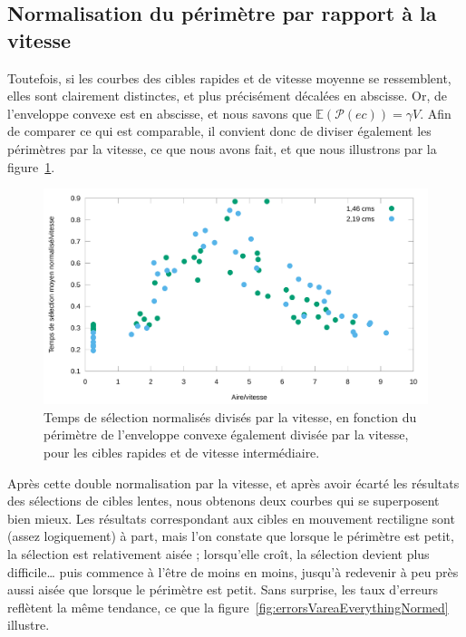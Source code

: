 	\subsection{Normalisation du périmètre par rapport à la vitesse}
	Toutefois, si les courbes des cibles rapides et de vitesse moyenne se ressemblent, elles sont clairement distinctes, et plus précisément décalées en abscisse. Or,  de l'enveloppe convexe est en abscisse, et nous savons que $\mathbb{E}(\mathcal{P}(ec)) = \gamma{}V$. Afin de comparer ce qui est comparable, il convient donc de diviser également les périmètres par la vitesse, ce que nous avons fait, et que nous illustrons par la figure~\ref{fig:perfVareaEverythingNormed}.

	\begin{figure}[!htb]
		\centering
		\includegraphics[width=\textwidth]{figures/ch4/perfVareaEverythingNormed}
		\caption[Temps de sélection/V en fonction de $\mathbb{E}(\mathcal{P}(ec))/V$]{Temps de sélection normalisés divisés par la vitesse, en fonction du périmètre de l'enveloppe convexe également divisée par la vitesse, pour les cibles rapides et de vitesse intermédiaire.}
		\label{fig:perfVareaEverythingNormed}
	\end{figure}
	
	Après cette double normalisation par la vitesse, et après avoir écarté les résultats des sélections de cibles lentes, nous obtenons deux courbes qui se superposent bien mieux. Les résultats correspondant aux cibles en mouvement rectiligne sont (assez logiquement) à part, mais l'on constate que lorsque le périmètre est petit, la sélection est relativement aisée ; lorsqu'elle croît, la sélection devient plus difficile\ldots{} puis commence à l'être de moins en moins, jusqu'à redevenir à peu près aussi aisée que lorsque le périmètre est petit. Sans surprise, les taux d'erreurs reflètent la même tendance, ce que la figure~\ref{fig:errorsVareaEverythingNormed} illustre.
	
